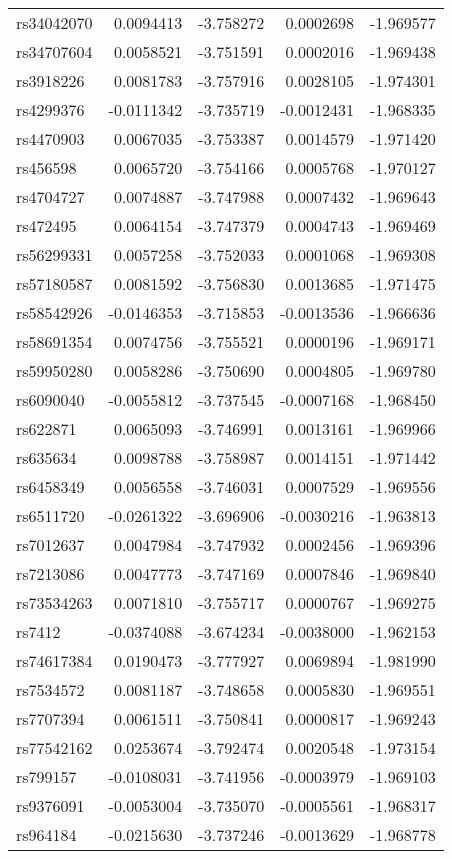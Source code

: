 \documentclass[
]{article}
\theoremstyle{plain}
\begin{document}
\begin{longtable}[t]{lrrrr}
\addlinespace
rs34042070 & 0.0094413 & -3.758272 & 0.0002698 & -1.969577\\
rs34707604 & 0.0058521 & -3.751591 & 0.0002016 & -1.969438\\
rs3918226 & 0.0081783 & -3.757916 & 0.0028105 & -1.974301\\
rs4299376 & -0.0111342 & -3.735719 & -0.0012431 & -1.968335\\
rs4470903 & 0.0067035 & -3.753387 & 0.0014579 & -1.971420\\
\addlinespace
rs456598 & 0.0065720 & -3.754166 & 0.0005768 & -1.970127\\
rs4704727 & 0.0074887 & -3.747988 & 0.0007432 & -1.969643\\
rs472495 & 0.0064154 & -3.747379 & 0.0004743 & -1.969469\\
rs56299331 & 0.0057258 & -3.752033 & 0.0001068 & -1.969308\\
rs57180587 & 0.0081592 & -3.756830 & 0.0013685 & -1.971475\\
\addlinespace
rs58542926 & -0.0146353 & -3.715853 & -0.0013536 & -1.966636\\
rs58691354 & 0.0074756 & -3.755521 & 0.0000196 & -1.969171\\
rs59950280 & 0.0058286 & -3.750690 & 0.0004805 & -1.969780\\
rs6090040 & -0.0055812 & -3.737545 & -0.0007168 & -1.968450\\
rs622871 & 0.0065093 & -3.746991 & 0.0013161 & -1.969966\\
\addlinespace
rs635634 & 0.0098788 & -3.758987 & 0.0014151 & -1.971442\\
rs6458349 & 0.0056558 & -3.746031 & 0.0007529 & -1.969556\\
rs6511720 & -0.0261322 & -3.696906 & -0.0030216 & -1.963813\\
rs7012637 & 0.0047984 & -3.747932 & 0.0002456 & -1.969396\\
rs7213086 & 0.0047773 & -3.747169 & 0.0007846 & -1.969840\\
\addlinespace
rs73534263 & 0.0071810 & -3.755717 & 0.0000767 & -1.969275\\
rs7412 & -0.0374088 & -3.674234 & -0.0038000 & -1.962153\\
rs74617384 & 0.0190473 & -3.777927 & 0.0069894 & -1.981990\\
rs7534572 & 0.0081187 & -3.748658 & 0.0005830 & -1.969551\\
rs7707394 & 0.0061511 & -3.750841 & 0.0000817 & -1.969243\\
\addlinespace
rs77542162 & 0.0253674 & -3.792474 & 0.0020548 & -1.973154\\
rs799157 & -0.0108031 & -3.741956 & -0.0003979 & -1.969103\\
rs9376091 & -0.0053004 & -3.735070 & -0.0005561 & -1.968317\\
rs964184 & -0.0215630 & -3.737246 & -0.0013629 & -1.968778\\*
\end{longtable}
\end{document}
